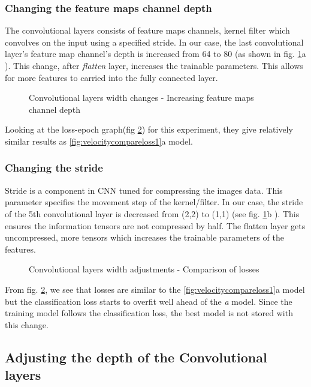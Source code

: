 \subsubsection*{Changing the feature maps channel depth}
The convolutional layers consists of feature maps channels, kernel filter which convolves
on the input using a specified stride. In our case, the last convolutional layer's feature
map channel's depth is increased from 64 to 80 (as shown in fig. \ref{fig:convlayerschange1}a ). This change, after \textit{flatten} layer,
increases the trainable parameters. This allows for more features to carried into the fully connected layer.
\begin{figure}[!ht]
    \def\svgwidth{1\textwidth}
    \caption{Convolutional layers width changes - Increasing feature maps channel depth}
    \label{fig:convlayerschange1}
\end{figure}
Looking at the loss-epoch graph(fig \ref{fig:convlayerslosses1}) for this experiment, they
give relatively similar results as \ref{fig:velocitycompareloss1}a model.
\subsubsection*{Changing the stride}
Stride is a component in CNN tuned for compressing the images data. This parameter
specifies the movement step of the kernel/filter. In our case, the stride of the 5th
convolutional layer is decreased from (2,2) to (1,1) (see fig.
\ref{fig:convlayerschange1}b ). This ensures the information
tensors are not compressed by half. The flatten layer gets uncompressed, more tensors
which increases the trainable parameters of the features.
\begin{figure}[!ht]
    \centering
    \def\svgwidth{\textwidth}
    \caption{Convolutional layers width adjustments - Comparison of losses}
    \label{fig:convlayerslosses1}
\end{figure}
From fig. \ref{fig:convlayerslosses1}, we see that losses are similar to the
\ref{fig:velocitycompareloss1}a model but the classification loss starts to overfit well
ahead of the \textit{a} model. Since the training model follows the classification loss,
the best model is not stored with this change.

\subsection{Adjusting the depth of the Convolutional layers}
